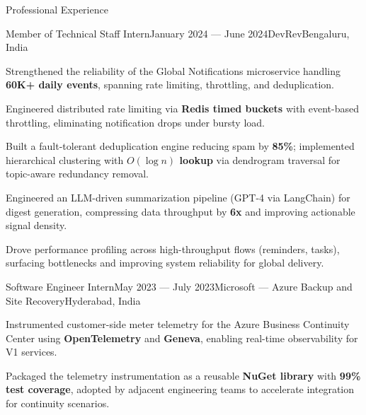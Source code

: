 \begin{rSection}{Professional Experience}
    \begin{rSubsection}{Member of Technical Staff Intern}{January 2024 --- June 2024}{DevRev}{Bengaluru, India}
        \item Strengthened the reliability of the Global Notifications microservice handling \textbf{60K+ daily events}, spanning rate limiting, throttling, and deduplication.
        \item Engineered distributed rate limiting via \textbf{Redis timed buckets} with event-based throttling, eliminating notification drops under bursty load.
        \item Built a fault-tolerant deduplication engine reducing spam by \textbf{85\%}; implemented hierarchical clustering with \textbf{$O(\log n)$ lookup} via dendrogram traversal for topic-aware redundancy removal.
        \item Engineered an LLM-driven summarization pipeline (GPT-4 via LangChain) for digest generation, compressing data throughput by \textbf{6x} and improving actionable signal density.
        \item Drove performance profiling across high-throughput flows (reminders, tasks), surfacing bottlenecks and improving system reliability for global delivery.
    \end{rSubsection}

    \begin{rSubsection}{Software Engineer Intern}{May 2023 --- July 2023}{Microsoft --- Azure Backup and Site Recovery}{Hyderabad, India}
        \item Instrumented customer-side meter telemetry for the Azure Business Continuity Center using \textbf{OpenTelemetry} and \textbf{Geneva}, enabling real-time observability for V1 services.
        \item Packaged the telemetry instrumentation as a reusable \textbf{NuGet library} with \textbf{99\% test coverage}, adopted by adjacent engineering teams to accelerate integration for continuity scenarios.
    \end{rSubsection}

\end{rSection}